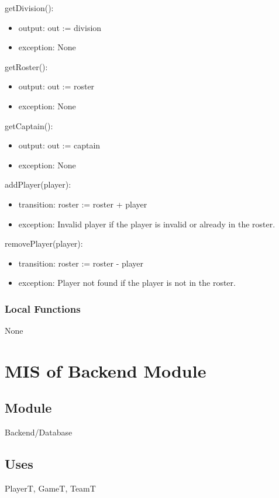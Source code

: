 \documentclass[12pt, titlepage]{article}
\begin{document}
\noindent getDivision():
\begin{itemize}
  \item output: out := division
  \item exception: None
\end{itemize}

\noindent getRoster():
\begin{itemize}
  \item output: out := roster
  \item exception: None
\end{itemize}

\noindent getCaptain():
\begin{itemize}
  \item output: out := captain
  \item exception: None
\end{itemize}

\noindent addPlayer(player):
\begin{itemize}
  \item transition: roster := roster + player
  \item exception: Invalid player if the player is invalid or already in the roster.
\end{itemize}

\noindent removePlayer(player):
\begin{itemize}
  \item transition: roster := roster - player
  \item exception: Player not found if the player is not in the roster.
\end{itemize}

\subsubsection{Local Functions}
None

\section{MIS of Backend Module} \label{Backend}

\subsection{Module}

Backend/Database

\subsection{Uses}
PlayerT, GameT, TeamT
\end{document}

